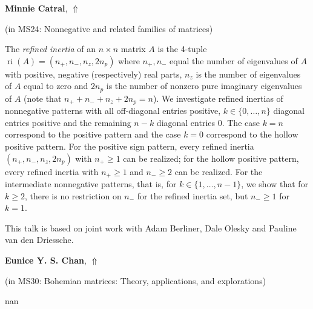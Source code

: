 \documentclass[ILAS2025-program.tex]{subfiles}
\begin{document}
     \hypertarget{down0198}{}\begin{ilasabstract}
    
    \textbf{Minnie Catral},  \hfill \hyperlink{up0198}{$\Uparrow$}
    
    (in {\color{mstitle}MS24: Nonnegative and related families of matrices})
        
        \mtskip
    \newcommand{\ri}{\operatorname{ri}}
The  {\em refined inertia} of  an $n\times n$ matrix $A$  is the 4-tuple $\ri(A)=(n_+,n_-,n_z,2n_p)$ where $n_+,n_-$ equal the number of eigenvalues of $A$ with positive, negative (respectively) real parts, $n_z$ is the number of eigenvalues of $A$  equal to zero and $2n_p$ is the number of nonzero pure imaginary eigenvalues of $A$ (note that $n_+ + n_-+ n_z+2n_p = n$).  
We investigate refined inertias of nonnegative patterns with  all off-diagonal entries positive,  $k \in\{0, \dots, n\}$ diagonal entries positive and the remaining $n-k$ diagonal entries $0$. The case $k=n$ correspond to the positive pattern and the case $k=0$ correspond to the hollow positive pattern. For the positive sign pattern, every refined inertia  $(n_+, n_-, n_z, 2n_p)$ with $n_+ \geq 1$  can be realized; for the hollow positive  pattern, every refined inertia with $n_+ \geq 1$ and $n_- \geq 2$ can be realized. For the intermediate nonnegative patterns, that is, for  $k \in\{1, \dots, n-1\}$, we show that for $k \geq 2$,  there is no restriction on $n_-$ for the refined inertia set, but  $n_- \geq 1$ for $k=1$. 

This talk is based on joint work with Adam Berliner, Dale Olesky and Pauline van den Driessche.





\end{ilasabstract}
     \hypertarget{down0231}{}\begin{ilasabstract}
    
    \textbf{Eunice Y. S. Chan},  \hfill \hyperlink{up0231}{$\Uparrow$}
    
    (in {\color{mstitle}MS30: Bohemian matrices: Theory, applications, and explorations})
        
        \mtskip
    nan\end{ilasabstract}
\end{document}
